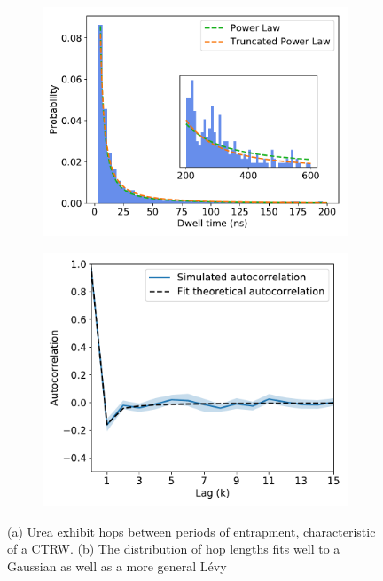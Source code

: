 \documentclass{article}
\begin{document}
\begin{figure}
  \begin{subfigure}{0.45\textwidth}
  \includegraphics[width=\textwidth]{URE_powerlaw.pdf}
  \caption{}\label{fig:powerlaw}
  \end{subfigure}
  \begin{subfigure}{0.45\textwidth}
  \includegraphics[width=\textwidth]{URE_hop_acf.pdf}
  \caption{}\label{fig:hop_acf}
  \end{subfigure}
  \caption{(a) Urea exhibit hops between periods of entrapment, characteristic of a CTRW. 
  (b) The distribution of hop lengths fits well to a Gaussian as well as a more general L\'evy 
}
\end{figure}
\end{document}
